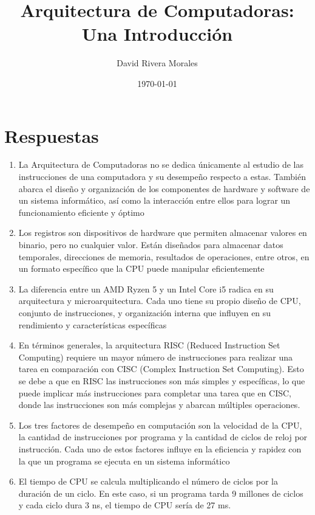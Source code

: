 \documentclass{article}
\title{Arquitectura de Computadoras: Una Introducción}
\author{David Rivera Morales}
\date{\today}
\begin{document}
\maketitle

\section{Respuestas}
\begin{enumerate}
    \item La Arquitectura de Computadoras no se dedica únicamente al estudio de las instrucciones de una computadora y su desempeño respecto a estas. También abarca el diseño y organización de los componentes de hardware y software de un sistema informático, así como la interacción entre ellos para lograr un funcionamiento eficiente y óptimo 
    
    \item Los registros son dispositivos de hardware que permiten almacenar valores en binario, pero no cualquier valor. Están diseñados para almacenar datos temporales, direcciones de memoria, resultados de operaciones, entre otros, en un formato específico que la CPU puede manipular eficientemente 
    
    \item La diferencia entre un AMD Ryzen 5 y un Intel Core i5 radica en su arquitectura y microarquitectura. Cada uno tiene su propio diseño de CPU, conjunto de instrucciones, y organización interna que influyen en su rendimiento y características específicas
    
    \item En términos generales, la arquitectura RISC (Reduced Instruction Set Computing) requiere un mayor número de instrucciones para realizar una tarea en comparación con CISC (Complex Instruction Set Computing). Esto se debe a que en RISC las instrucciones son más simples y específicas, lo que puede implicar más instrucciones para completar una tarea que en CISC, donde las instrucciones son más complejas y abarcan múltiples operaciones.
    
    \item Los tres factores de desempeño en computación son la velocidad de la CPU, la cantidad de instrucciones por programa y la cantidad de ciclos de reloj por instrucción. Cada uno de estos factores influye en la eficiencia y rapidez con la que un programa se ejecuta en un sistema informático 
    
    \item El tiempo de CPU se calcula multiplicando el número de ciclos por la duración de un ciclo. En este caso, si un programa tarda 9 millones de ciclos y cada ciclo dura 3 ns, el tiempo de CPU sería de 27 ms.
    

\end{enumerate}
\end{document}
